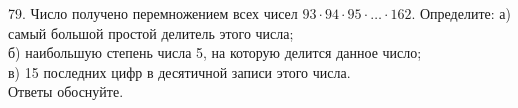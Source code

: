 79. Число получено перемножением всех чисел $93\cdot94\cdot95\cdot\ldots\cdot162.$ Определите:
а) самый большой простой делитель этого числа;\\
б) наибольшую степень числа 5, на которую делится данное число;\\
в) 15 последних цифр в десятичной записи этого числа.\\
Ответы обоснуйте.\\
